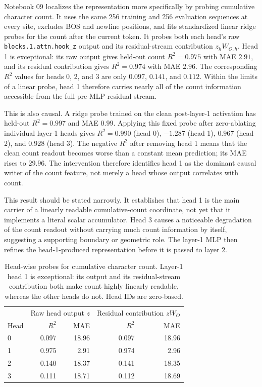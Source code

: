 \documentclass[11pt]{article}
\begin{document}
Notebook 09 localizes the representation more specifically by probing
cumulative character count.  It uses the same 256 training and 256 evaluation
sequences at every site, excludes BOS and newline positions, and fits
standardized linear ridge probes for the count after the current token.  It
probes both each head's raw \texttt{blocks.1.attn.hook\_z} output and its
residual-stream contribution $z_hW_{O,h}$.  Head 1 is exceptional: its raw
output gives held-out count $R^2=0.975$ with MAE $2.91$, and its residual
contribution gives $R^2=0.974$ with MAE $2.96$.  The corresponding $R^2$
values for heads 0, 2, and 3 are only $0.097$, $0.141$, and $0.112$.
Within the limits of a linear probe, head 1 therefore carries nearly all of
the count information accessible from the full pre-MLP residual stream.

This is also causal.  A ridge probe trained on the clean post-layer-1
activation has held-out $R^2=0.997$ and MAE $0.99$.  Applying this fixed probe
after zero-ablating individual layer-1 heads gives $R^2=0.990$ (head 0),
$-1.287$ (head 1), $0.967$ (head 2), and $0.928$ (head 3).  The negative
$R^2$ after removing head 1 means that the clean count readout becomes worse
than a constant mean prediction; its MAE rises to $29.96$.  The intervention
therefore identifies head 1 as the dominant causal writer of the count
feature, not merely a head whose output correlates with count.

This result should be stated narrowly.  It establishes that head 1 is the
main carrier of a linearly readable cumulative-count coordinate, not yet that
it implements a literal scalar accumulator.  Head 3 causes a noticeable
degradation of the count readout without carrying much count information by
itself, suggesting a supporting boundary or geometric role.  The layer-1 MLP
then refines the head-1-produced representation before it is passed to layer
2.

\begin{table}[t]
\centering
\small
\begin{tabular}{lrrrr}
\toprule
 & \multicolumn{2}{c}{Raw head output $z$} &
   \multicolumn{2}{c}{Residual contribution $zW_O$} \\
Head & $R^2$ & MAE & $R^2$ & MAE \\
\midrule
0 & 0.097 & 18.96 & 0.097 & 18.96 \\
1 & 0.975 & 2.91 & 0.974 & 2.96 \\
2 & 0.140 & 18.37 & 0.141 & 18.35 \\
3 & 0.111 & 18.71 & 0.112 & 18.69 \\
\bottomrule
\end{tabular}
\caption{Head-wise probes for cumulative character count. Layer-1 head 1
is exceptional: its output and its residual-stream contribution both make
count highly linearly readable, whereas the other heads do not. Head IDs are
zero-based.}
\label{tab:headwise-count-probes}
\end{table}
\end{document}
